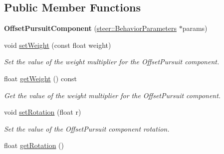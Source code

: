 \subsection*{Public Member Functions}
\begin{DoxyCompactItemize}
\item 
\hypertarget{classsteer_1_1_offset_pursuit_component_aff55362cf15ea271b8563f7509a11ef5}{{\bfseries Offset\-Pursuit\-Component} (\hyperlink{structsteer_1_1_behavior_parameters}{steer\-::\-Behavior\-Parameters} $\ast$params)}\label{classsteer_1_1_offset_pursuit_component_aff55362cf15ea271b8563f7509a11ef5}

\item 
void \hyperlink{classsteer_1_1_offset_pursuit_component_afa17a1f914ea3f8c06e65c13ab6f4b21}{set\-Weight} (const float weight)
\begin{DoxyCompactList}\small\item\em Set the value of the weight multiplier for the Offset\-Pursuit component. \end{DoxyCompactList}\item 
\hypertarget{classsteer_1_1_offset_pursuit_component_a9d2e14e78dfbdc3ef6791aa2771dc126}{float \hyperlink{classsteer_1_1_offset_pursuit_component_a9d2e14e78dfbdc3ef6791aa2771dc126}{get\-Weight} () const }\label{classsteer_1_1_offset_pursuit_component_a9d2e14e78dfbdc3ef6791aa2771dc126}

\begin{DoxyCompactList}\small\item\em Get the value of the weight multiplier for the Offset\-Pursuit component. \end{DoxyCompactList}\item 
\hypertarget{classsteer_1_1_offset_pursuit_component_a24467edbaec6e36e8291669303ab3856}{void \hyperlink{classsteer_1_1_offset_pursuit_component_a24467edbaec6e36e8291669303ab3856}{set\-Rotation} (float r)}\label{classsteer_1_1_offset_pursuit_component_a24467edbaec6e36e8291669303ab3856}

\begin{DoxyCompactList}\small\item\em Set the value of the Offset\-Pursuit component rotation. \end{DoxyCompactList}\item 
\hypertarget{classsteer_1_1_offset_pursuit_component_a85cc7c083e1f6a4de0ffab4d49aa48a1}{float \hyperlink{classsteer_1_1_offset_pursuit_component_a85cc7c083e1f6a4de0ffab4d49aa48a1}{get\-Rotation} ()}\label{classsteer_1_1_offset_pursuit_component_a85cc7c083e1f6a4de0ffab4d49aa48a1}


\end{DoxyCompactItemize}
